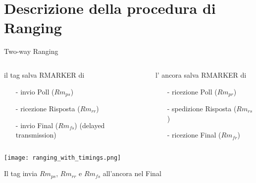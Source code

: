 \section{Descrizione della procedura di Ranging}

\begin{frame}{Two-way Ranging}
  \begin{columns}[T]
    \begin{column}{0.5\textwidth}
      il \alert{tag} salva RMARKER di
      \begin{itemize}
      \item[-] invio Poll ($Rm_{ps}$)
      \item[-] ricezione Risposta ($Rm_{rr}$)
      \item[-] invio Final ($Rm_{fs}$) (delayed transmission)
      \end{itemize}
    \end{column}
    \begin{column}{0.5\textwidth}
      l' \alert{ancora} salva RMARKER di
      \begin{itemize}
      \item[-] ricezione Poll ($Rm_{pr}$)
      \item[-] spedizione Risposta ($Rm_{rs}$)
      \item[-] ricezione Final ($Rm_{fr}$)
      \end{itemize}
    \end{column}
  \end{columns}
  \begin{center}
    \texttt{[image: ranging\_with\_timings.png]}
  \end{center}
  Il tag invia $Rm_{ps}$, $Rm_{rr}$ e $Rm_{fs}$ all'ancora nel Final
\end{frame}

